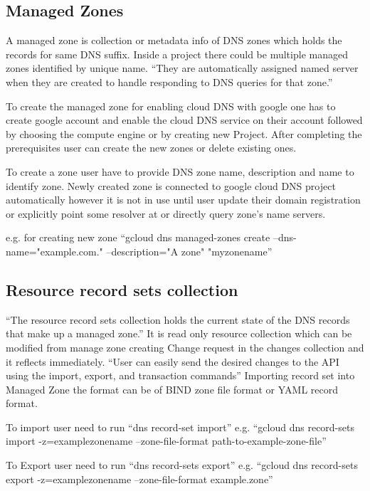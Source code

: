 \documentclass[9pt,twocolumn,twoside]{styles/osajnl}
\begin{document}
\subsection{Managed Zones}
A managed zone is collection or metadata info of DNS zones which holds the records for same DNS suffix. Inside a project there could be multiple managed zones identified by unique name. “They are automatically assigned named server when they are created to handle responding to DNS queries for that zone.” \cite{dns-zne}

To create the managed zone for enabling cloud DNS with google one has to create google account and enable the cloud DNS service on their account followed by choosing the compute engine or by creating new Project. After completing the prerequisites user can create the new zones or delete existing ones. 

To create a zone user have to provide DNS zone name, description and name to identify zone. Newly created zone is connected to google cloud DNS project automatically however it is not in use until user update their domain registration or explicitly point some resolver at or directly query zone’s name servers.

e.g. for creating new zone
“gcloud dns managed-zones create --dns-name="example.com." --description="A zone" "myzonename”\cite{dns-overview}

\subsection{Resource record sets collection}
“The resource record sets collection holds the current state of the DNS records that make up a managed zone.” \cite{dns-overview} It is read only resource collection which can be modified from manage zone creating Change request in the changes collection and it reflects immediately. “User can easily send the desired changes to the API using the import, export, and transaction commands” \cite{dns-overview}
Importing record set into Managed Zone the format can be of BIND zone file format or YAML record format.

To import user need to run “dns record-set import”
e.g. “gcloud dns record-sets import -z=examplezonename --zone-file-format path-to-example-zone-file” \cite{dns-overview}

To Export user need to run “dns record-sets export”
e.g.  “gcloud dns record-sets export -z=examplezonename --zone-file-format example.zone” \cite{dns-overview}
\end{document}

